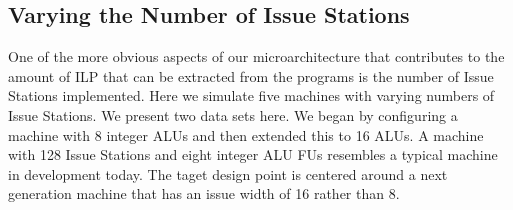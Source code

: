 \documentclass[10pt,dvips]{article}
\begin{document}
\subsection{Varying the Number of Issue Stations}
%
One of the more obvious aspects of our microarchitecture
that contributes to the amount of ILP
that can be extracted from the programs is the number of Issue Stations
implemented.
Here we simulate five machines with
varying numbers of Issue Stations.
We present two data sets here.  
We began by configuring a machine with  
8 integer ALUs and then extended this to 16 ALUs.
A machine  
with 128 Issue Stations and eight integer ALU FUs resembles
a typical machine in development today.
The taget design point is centered around a next generation
machine that has an issue width of 16 rather than 8.
\end{document}
